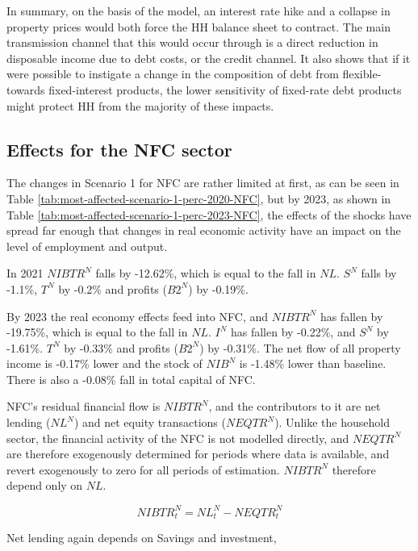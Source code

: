 \documentclass[
]{book}
\begin{document}
In summary, on the basis of the model, an interest rate hike and a collapse in property prices would both force the HH balance sheet to contract. The main transmission channel that this would occur through is a direct reduction in disposable income due to debt costs, or the credit channel. It also shows that if it were possible to instigate a change in the composition of debt from flexible- towards fixed-interest products, the lower sensitivity of fixed-rate debt products might protect HH from the majority of these impacts.

\hypertarget{effects-for-the-nfc-sector}{%
\subsection{Effects for the NFC sector}\label{effects-for-the-nfc-sector}}

The changes in Scenario 1 for NFC are rather limited at first, as can be seen in Table \ref{tab:most-affected-scenario-1-perc-2020-NFC}, but by 2023, as shown in Table \ref{tab:most-affected-scenario-1-perc-2023-NFC}, the effects of the shocks have spread far enough that changes in real economic activity have an impact on the level of employment and output.

In 2021 \(NIBTR^N\) falls by -12.62\%, which is equal to the fall in \(NL\). \(S^N\) falls by -1.1\%, \(T^N\) by -0.2\%
and profits (\(B2^N\)) by -0.19\%.

By 2023 the real economy effects feed into NFC, and \(NIBTR^N\) has fallen by -19.75\%, which is equal to the fall in \(NL\). \(I^N\) has fallen by -0.22\%, and \(S^N\) by -1.61\%. \(T^N\) by -0.33\% and profits (\(B2^N\)) by -0.31\%. The net flow of all property income is -0.17\% lower and the stock of \(NIB^N\) is -1.48\% lower than baseline. There is also a -0.08\% fall in total capital of NFC.

NFC's residual financial flow is \(NIBTR^N\), and the contributors to it are net lending (\(NL^N\)) and net equity transactions (\(NEQTR^N\)). Unlike the household sector, the financial activity of the NFC is not modelled directly, and \(NEQTR^N\) are therefore exogenously determined for periods where data is available, and revert exogenously to zero for all periods of estimation. \(NIBTR^N\) therefore depend only on \(NL\).

\begin{equation}
NIBTR^N_t = NL^N_t - NEQTR^N_t
\end{equation}

Net lending again depends on Savings and investment,
\end{document}
